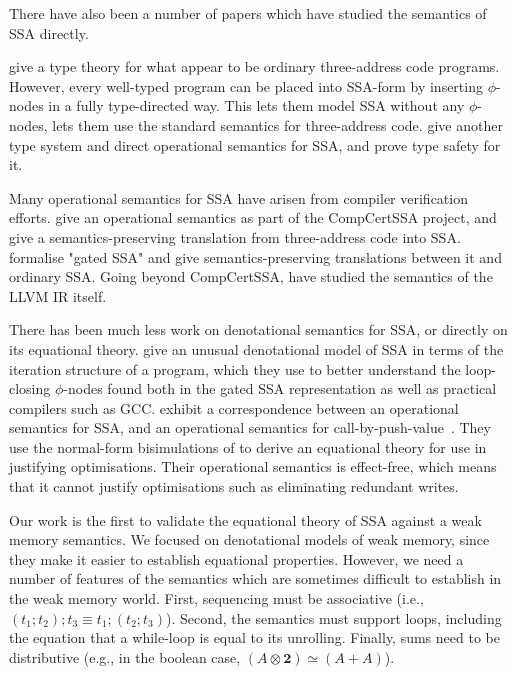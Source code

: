 \documentclass[acmsmall,screen,review]{acmart}
\newcommand{\mb}[1]{\ensuremath{\mathbf{#1}}}
\begin{document}
There have also been a number of papers which have studied the semantics of SSA
directly.

\citet{ssa-types-matsuno-ohori-06} give a type theory for what appear to be
ordinary three-address code programs. However, every well-typed program can be
placed into SSA-form by inserting $\phi$-nodes in a fully type-directed way.
This lets them model SSA without any $\phi$-nodes, lets them use the standard
semantics for three-address code.
%
\citet{hua-explicit-ssa-2010} give another type system and direct operational
semantics for SSA, and prove type safety for it. 

Many operational semantics for SSA have arisen from compiler verification
efforts. \citet{barthe-compcert-ssa-2014} give an operational semantics as part
of the CompCertSSA project, and give a semantics-preserving translation from
three-address code into SSA. \citet{herklotz-gsa-2023} formalise "gated SSA" and
give semantics-preserving translations between it and ordinary SSA. Going beyond
CompCertSSA, \citet{vellum} have studied the semantics of the LLVM IR itself.

There has been much less work on denotational semantics for SSA, or directly on
its equational theory. \citet{pop-ssa-inout-2009} give an unusual denotational
model of SSA in terms of the iteration structure of a program, which they use to
better understand the loop-closing $\phi$-nodes found both in the gated SSA
representation as well as practical compilers such as GCC.
\citet{garbuzov-structural-cfg-2018} exhibit a correspondence between an
operational semantics for SSA, and an operational semantics for
call-by-push-value~\cite{cbpv}. They use the normal-form bisimulations of
\citet{lassen-bisim} to derive an equational theory for use in justifying
optimisations. Their operational semantics is effect-free, which means that it
cannot justify optimisations such as eliminating redundant writes.

Our work is the first to validate the equational theory of SSA against a weak
memory semantics. We focused on denotational models of weak memory, since they
make it easier to establish equational properties. However, we need a number of
features of the semantics which are sometimes difficult to establish in the weak
memory world. First, sequencing must be associative (i.e., $(t_1; t_2); t_3
\equiv t_1; (t_2; t_3)$).  Second, the semantics must support loops, including
the equation that a while-loop is equal to its unrolling. Finally, sums need to
be distributive (e.g., in the boolean case, $(A \otimes \mb{2}) \simeq (A +
A)$).
\end{document}
